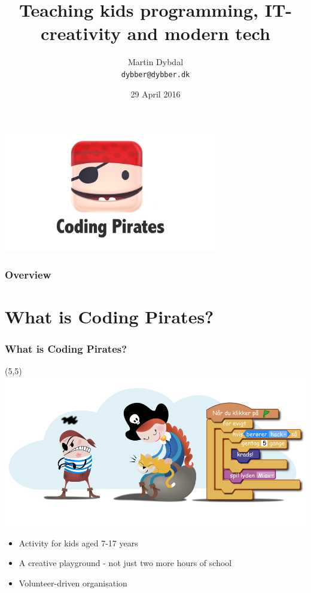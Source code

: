 \documentclass{beamer}
\title[APL \& TAIL] %
  {Teaching kids programming, IT-creativity and modern tech} %
\author{\footnotesize{Martin Dybdal} \\ \footnotesize{\texttt{dybber@dybber.dk}}}
\institute {
DIKU \\
University of Copenhagen
}
\date{\footnotesize{29 April 2016}}
\begin{document}
{
\begin{frame}
  \begin{center}
    \includegraphics[width=0.7\textwidth]{imagery/codingpirates.png}
  \end{center}
\vspace{-1cm}
\titlepage
\end{frame}
}


\begin{frame}
\frametitle{Overview}
\tableofcontents
\end{frame}


\section{What is Coding Pirates?}
\begin{frame}
\frametitle{What is Coding Pirates?}
\begin{textblock}{20}(5,5)
 \includegraphics[width=\textwidth]{imagery/cpthack-and-miss1337-transp.png}
\end{textblock}

\begin{itemize}
\item Activity for kids aged 7-17 years
\item A creative playground - not just two more hours of school
\item Volunteer-driven organisation
\end{itemize}
\vspace{4cm}
\end{frame}
\end{document}
